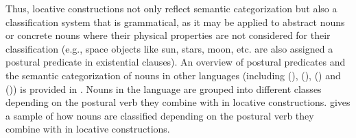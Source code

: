    \z
\z

Thus, locative constructions not only reflect semantic categorization but also a classification system that is grammatical, as it may be applied to abstract nouns or concrete nouns where their physical properties are not considered for their classification (e.g., space objects like sun, stars, moon, etc. are also assigned a postural predicate in existential clauses). An overview of postural predicates and the semantic categorization of nouns in other  languages (including  (),  (),  () and  ()) is provided in \citet{o2015typological}. Nouns in the language are grouped into different classes depending on the postural verb they combine with in locative constructions.  gives a sample of how nouns are classified depending on the postural verb they combine with in locative constructions.


